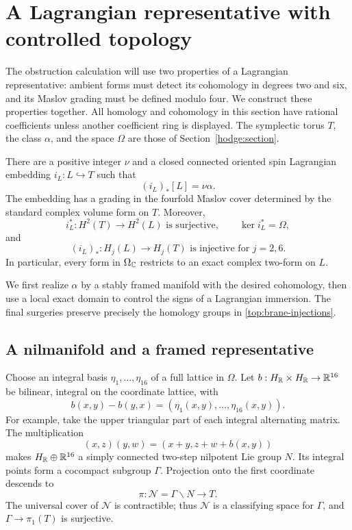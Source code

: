 \section{A Lagrangian representative with controlled topology}
\label{top:section}

The obstruction calculation will use two properties of a Lagrangian
representative: ambient forms must detect its cohomology in degrees two
and six, and its Maslov grading must be defined modulo four.  We construct
these properties together.  All homology and cohomology in this section
have rational coefficients unless another coefficient ring is displayed.
The symplectic torus $T$, the class $\alpha$, and the space $\Omega$ are
those of Section~\ref{hodge:section}.

\begin{proposition}
\label{top:brane}
There are a positive integer $\nu$ and a closed connected oriented spin
Lagrangian embedding $i_L:L\hookrightarrow T$ such that
\begin{equation}\label{top:brane-class}
 (i_L)_*[L]=\nu\alpha.
\end{equation}
The embedding has a grading in the fourfold Maslov cover determined by
the standard complex volume form on $T$.  Moreover,
\begin{equation}\label{top:brane-cohomology}
 i_L^*:H^2(T)\longrightarrow H^2(L)
 \text{ is surjective},\qquad \ker i_L^*=\Omega,
\end{equation}
and
\begin{equation}\label{top:brane-injections}
 (i_L)_*:H_j(L)\longrightarrow H_j(T)
 \text{ is injective for }j=2,6.
\end{equation}
In particular, every form in $\Omega_{\mathbb C}$ restricts to an exact complex
two-form on $L$.
\end{proposition}

We first realize $\alpha$ by a stably framed manifold with the desired
cohomology, then use a local exact domain to control the signs of a
Lagrangian immersion.  The final surgeries preserve precisely the
homology groups in \eqref{top:brane-injections}.

\subsection{A nilmanifold and a framed representative}

Choose an integral basis $\eta_1,\ldots,\eta_{16}$ of a full lattice in
$\Omega$.  Let $b:H_{\mathbb R}\times H_{\mathbb R}\to\mathbb R^{16}$ be bilinear,
integral on the coordinate lattice, with
\[
 b(x,y)-b(y,x)=(\eta_1(x,y),\ldots,\eta_{16}(x,y)).
\]
For example, take the upper triangular part of each integral alternating
matrix.  The multiplication
\[
 (x,z)(y,w)=(x+y,z+w+b(x,y))
\]
makes $H_{\mathbb R}\oplus\mathbb R^{16}$ a simply connected two-step nilpotent
Lie group $N$.  Its integral points form a cocompact subgroup $\Gamma$.
Projection onto the first coordinate descends to
\[
 \pi:\mathcal N=\Gamma\backslash N\longrightarrow T.
\]
The universal cover of $\mathcal N$ is contractible; thus
$\mathcal N$ is a classifying space for $\Gamma$, and
$\Gamma\to\pi_1(T)$ is surjective.

